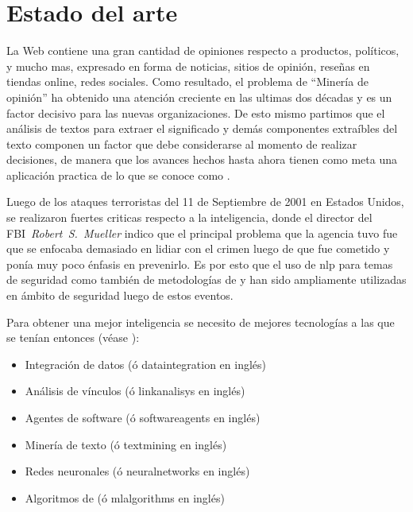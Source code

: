 \chapter{Estado del arte} %

\label{chStateOfTheArt} %



La Web contiene una gran cantidad de opiniones respecto a productos, políticos, y mucho mas, expresado en forma de noticias, sitios de opinión, reseñas en tiendas online, redes sociales. Como resultado, el problema de ``Minería de opinión'' ha obtenido una atención creciente en las ultimas dos décadas y es un factor decisivo para las nuevas organizaciones. De esto mismo partimos que el análisis de textos para extraer el significado y demás componentes extraíbles del texto componen un factor que debe considerarse al momento de realizar decisiones, de manera que los avances hechos hasta ahora tienen como meta una aplicación practica de lo que se conoce como .

Luego de los ataques terroristas del 11 de Septiembre de 2001 en Estados Unidos, se realizaron fuertes criticas respecto a la inteligencia, donde el director del FBI~\emph{Robert~S.~Mueller} indico que el principal problema que la agencia tuvo fue que se enfocaba demasiado en lidiar con el crimen luego de que fue cometido y ponía muy poco énfasis en prevenirlo. Es por esto que el uso de \gls{nlp} para temas de seguridad como también de metodologías de  y  han sido ampliamente utilizadas en ámbito de seguridad luego de estos eventos.

Para obtener una mejor inteligencia se necesito de mejores tecnologías a las que se tenían entonces (véase \cite[p\'ag 2]{mena2003investigative}):
\begin{itemize}
\item Integración de datos (\'o \gls{dataintegration} en ingl\'es)
\item Análisis de vínculos (\'o \gls{linkanalisys} en ingl\'es)
\item Agentes de software (\'o \gls{softwareagents} en ingl\'es)
\item Minería de texto (\'o \gls{textmining} en ingl\'es)
\item Redes neuronales (\'o \gls{neuralnetworks} en ingl\'es)
\item Algoritmos de  (\'o \gls{mlalgorithms} en ingl\'es)
\end{itemize}

